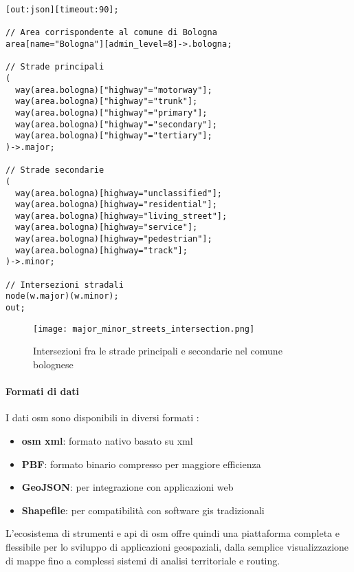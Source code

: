 \begin{lstlisting}[caption={Query in Overpass \acrshort{ql} di esempio}, label=lst:esempio]
[out:json][timeout:90];

// Area corrispondente al comune di Bologna
area[name="Bologna"][admin_level=8]->.bologna;

// Strade principali
(
  way(area.bologna)["highway"="motorway"];
  way(area.bologna)["highway"="trunk"];
  way(area.bologna)["highway"="primary"];
  way(area.bologna)["highway"="secondary"];
  way(area.bologna)["highway"="tertiary"];
)->.major;

// Strade secondarie
(
  way(area.bologna)[highway="unclassified"];
  way(area.bologna)[highway="residential"];
  way(area.bologna)[highway="living_street"];
  way(area.bologna)[highway="service"];
  way(area.bologna)[highway="pedestrian"];
  way(area.bologna)[highway="track"];
)->.minor;

// Intersezioni stradali
node(w.major)(w.minor);
out;
\end{lstlisting}

\begin{figure}[H]
  \centering
  \texttt{[image: major\_minor\_streets\_intersection.png]}
  \caption{Intersezioni fra le strade principali e secondarie nel comune bolognese}
  \label{fig:streets-intersections}
\end{figure}

\paragraph{Formati di dati}
I dati \acrshort{osm} sono disponibili in diversi formati \cite{geoapify2024}:
\begin{itemize}
  \item \textbf{\acrshort{osm} \acrshort{xml}}: formato nativo basato su \acrshort{xml}
  \item \textbf{PBF}: formato binario compresso per maggiore efficienza
  \item \textbf{GeoJSON}: per integrazione con applicazioni web
  \item \textbf{Shapefile}: per compatibilità con software \acrfull{gis} tradizionali
\end{itemize}

L'ecosistema di strumenti e \acrshort{api} di \acrfull{osm} offre quindi una piattaforma completa e flessibile per lo
sviluppo di applicazioni geospaziali, dalla semplice visualizzazione di mappe fino a complessi sistemi
di analisi territoriale e routing.

